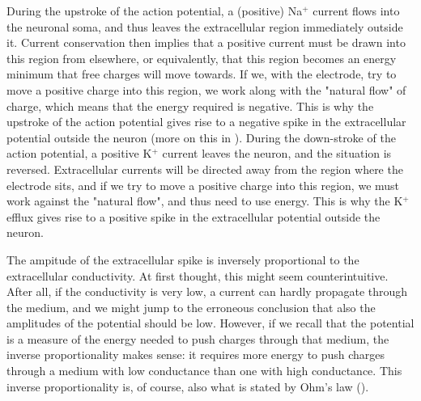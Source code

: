 During the upstroke of the action potential, a (positive) Na$^+$ current flows into the neuronal soma, and thus leaves the extracellular region immediately outside it. Current conservation then implies that a positive current must be drawn into this region from elsewhere, or equivalently, that this region becomes an energy minimum that free charges will move towards. If we, with the electrode, try to move a positive charge into this region, we work along with the "natural flow" of charge, which means that the energy required is negative. This is why the upstroke of the action potential gives rise to a negative spike in the extracellular potential outside the neuron (more on this in ). During the down-stroke of the action potential, a positive K$^+$ current leaves the neuron, and the situation is reversed. Extracellular currents will be directed away from the region where the electrode sits, and if we try to move a positive charge into this region, we must work against the "natural flow", and thus need to use energy. This is why the K$^+$ efflux gives rise to a positive spike in the extracellular potential outside the neuron.

The ampitude of the extracellular spike is inversely proportional to the extracellular conductivity. At first thought, this might seem counterintuitive. After all, if the conductivity is very low, a current can hardly propagate through the medium, and we might jump to the erroneous conclusion that also the amplitudes of the potential should be low. However, if we recall that the potential is a measure of the energy needed to push charges through that medium, the inverse proportionality makes sense: it requires more energy to push charges through a medium with low conductance than one with high conductance. This inverse proportionality is, of course, also what is stated by Ohm's law (). 

